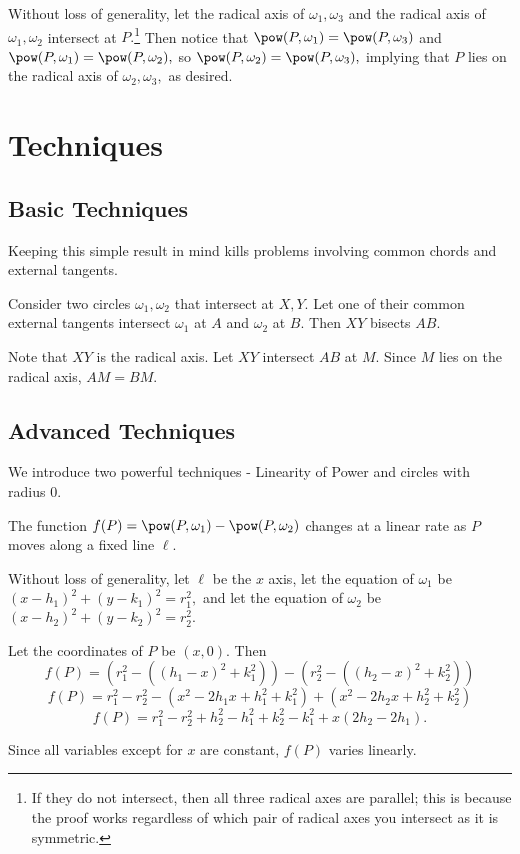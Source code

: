 \begin{pro}
Without loss of generality, let the radical axis of $\omega_1,\omega_3$ and the radical axis of $\omega_1,\omega_2$ intersect at $P.$\footnote{If they do not intersect, then all three radical axes are parallel; this is because the proof works regardless of which pair of radical axes you intersect as it is symmetric.} Then notice that $\pow(P,\omega_1)=\pow(P,\omega_3)$ and $\pow(P,\omega_1)=\pow(P,\omega_2),$ so $\pow(P,\omega_2)=\pow(P,\omega_3),$ implying that $P$ lies on the radical axis of $\omega_2,\omega_3,$ as desired.
\end{pro}

\section{Techniques}

\subsection{Basic Techniques}
Keeping this simple result in mind kills problems involving common chords and external tangents.

\begin{fact}
Consider two circles $\omega_1, \omega_2$ that intersect at $X,Y.$ Let one of their common external tangents intersect $\omega_1$ at $A$ and $\omega_2$ at $B.$ Then $XY$ bisects $AB.$
\end{fact}

\begin{pro}
Note that $XY$ is the radical axis. Let $XY$ intersect $AB$ at $M.$ Since $M$ lies on the radical axis, $AM=BM.$
\end{pro}

\subsection{Advanced Techniques}
We introduce two powerful techniques - Linearity of Power and circles with radius $0.$
\begin{theo}
The function $f(P)=\pow(P,\omega_1)-\pow(P,\omega_2)$ changes at a linear rate as $P$ moves along a fixed line $\ell.$
\end{theo}

\begin{pro}
Without loss of generality, let $\ell$ be the $x$ axis, let the equation of $\omega_1$ be $(x-h_1)^2+(y-k_1)^2=r_1^2,$ and let the equation of $\omega_2$ be $(x-h_2)^2+(y-k_2)^2=r_2^2.$

Let the coordinates of $P$ be $(x,0).$ Then
$$f(P)=(r_1^2-((h_1-x)^2+k_1^2))-(r_2^2-((h_2-x)^2+k_2^2))$$
$$f(P)=r_1^2-r_2^2-(x^2-2h_1x+h_1^2+k_1^2)+(x^2-2h_2x+h_2^2+k_2^2)$$
$$f(P)=r_1^2-r_2^2+h_2^2-h_1^2+k_2^2-k_1^2+x(2h_2-2h_1).$$

Since all variables except for $x$ are constant, $f(P)$ varies linearly.
\end{pro}

